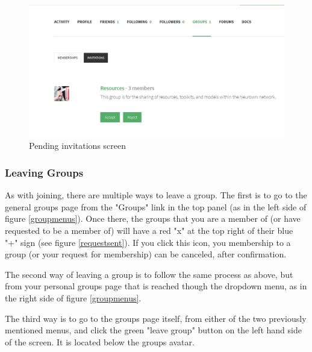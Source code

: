 \documentclass[10pt]{article}
\begin{document}
\begin{figure}[h]
    \centering
    \includegraphics[scale=0.3]{images/invitations.jpg}
    \caption{Pending invitations screen}
    \label{invites}
\end{figure}

\subsubsection{Leaving Groups}

\begin{flushleft}
As with joining, there are multiple ways to leave a group.  The first is to go to the general groups page from the "Groups" link in the top panel (as in the left side of figure \ref{groupmenus}).  Once there, the groups that you are a member of (or have requested to be a member of) will have a red "x" at the top right of their blue "+" sign (see figure \ref{requestsent}).  If you click this icon, you membership to a group (or your request for membership) can be canceled, after confirmation. 
\end{flushleft}

\begin{flushleft}
The second way of leaving a group is to follow the same process as above, but from your personal groups page that is reached though the dropdown menu, as in the right side of figure \ref{groupmenus}.
\end{flushleft}

\begin{flushleft}
The third way is to go to the groups page itself, from either of the two previously mentioned menus, and click the green "leave group" button on the left hand side of the screen.  It is located below the groups avatar. 
\end{flushleft}
\end{document}
